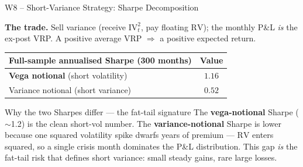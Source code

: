 \documentclass[aspectratio=169, 11pt]{beamer}
\begin{document}
\begin{frame}{W8 -- Short-Variance Strategy: Sharpe Decomposition}

\textbf{The trade.}\; Sell variance (receive $\mathrm{IV}_t^2$, pay floating $\mathrm{RV}$);
the monthly P\&L \textit{is} the ex-post VRP. A positive average VRP $\Rightarrow$ a
positive expected return.

\medskip
\begin{center}
\begin{tabular}{lc}
  \toprule
  Full-sample annualised Sharpe (300 months) & Value \\
  \midrule
  \textbf{Vega notional} (short volatility) & $\mathbf{1.16}$ \\
  Variance notional (short variance) & $0.52$ \\
  \bottomrule
\end{tabular}
\end{center}

\medskip
\begin{block}{Why the two Sharpes differ --- the fat-tail signature}
\small
The \textbf{vega-notional} Sharpe ($\sim$1.2) is the clean short-vol number. The
\textbf{variance-notional} Sharpe is lower because one squared volatility spike dwarfs
years of premium --- $\mathrm{RV}$ enters squared, so a single crisis month dominates the
P\&L distribution. This gap \textit{is} the fat-tail risk that defines short variance:
small steady gains, rare large losses.
\end{block}
\end{frame}
\end{document}
